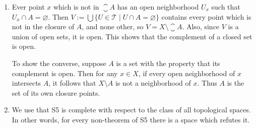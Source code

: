 \documentclass{article}
\newcommand{\topology}{{\mathcal{T}}}
\begin{document}
\maketitle

\begin{ex}
\begin{enumerate}
\item Ever point $x$ which is not in $\closure{A}$ has an open neighborhood
$U_x$ such that $U_x\cap A=\varnothing$. Then $V:=\bigcup\{U\in\topology\mid
U\cap A=\varnothing\}$ contains every point which is not in the closure of $A$,
and none other, so $V=X\setminus\closure{A}$. Also, since $V$ is a union of
open sets, it is open. This shows that the complement of a closed set is open.

To show the converse, suppose $A$ is a set with the property that its complement
is open. Then for any $x\in X$, if every open neighborhood of $x$ intersects $A$, it follows that
$X\setminus A$ is not a neighborhood of $x$. Thus $A$ is the set of its own
closure points.

\item We use that \textsf{S5} is complete with respect to the class of all
topological spaces. In other words, for every non-theorem of \textsf{S5} there
is a space which refutes it. 
\end{enumerate}
\end{ex}
\end{document}
